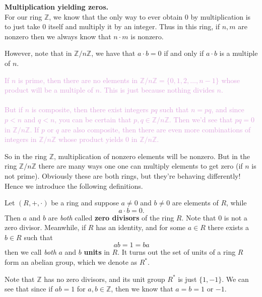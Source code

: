 \documentclass[12pt,letterpaper]{algebra_book}
\newcommand{\ZZ}{\mathbb{Z}}
\theoremstyle{definition}
\begin{document}
    \noindent\textbf{Multiplication yielding zeros.}\\
    For our ring $\mathbb{Z}$, we know that the only way to ever
    obtain $0$ by multiplication is to just take $0$ itself and multiply
    it by an integer. Thus in this ring, if $n, m$ are nonzero
    then we always know that $n \cdot m$ is nonzero.
    
    However, note that in $\ZZ/n\ZZ$, we have
    that $a \cdot b = 0$ if and only if $a \cdot b$ is a multiple
    of $n$.

    \textcolor{Plum}{If $n$ is prime, then there are no elements
    in $\ZZ/n\ZZ = \{0, 1, 2, \dots, n-1\}$ whose product will be
    a multiple of $n$. This is just because nothing divides $n$.
    \\
    \\
    But if $n$ is composite, then there exist
    integers $pq$ such that $n = pq$, and since $p < n$ and $q <
    n$, you can be certain that $p, q \in \ZZ/n\ZZ$. Then we'd see
    that $pq = 0$ in $\ZZ/n\ZZ$. If $p$ or $q$ are also composite, then
    there are even more combinations of integers in $\ZZ/n\ZZ$
    whose product yields 0 in $\ZZ/n\ZZ$. 
    }

    So in the ring $\ZZ$, multiplication of nonzero elements will
    be nonzero. But in the ring $\ZZ/n\ZZ$ there are many ways one
    one can multiply elements to get zero (if $n$ is not prime).
    Obviously these are both rings, but they're behaving
    differently! Hence we introduce the following definitions. 

    \begin{definition}
        Let $(R, +, \cdot)$ be a ring and suppose $a \ne 0$ and $b
        \ne 0$ are elements of $R$,
        while 
        \[
            a \cdot b = 0.
        \]
        Then $a$ and $b$ are \textit{both} called
        \textbf{zero divisors} of the ring ${R}$. Note that $0$ is
        not a zero divisor.
        Meanwhile, if $R$ has an identity, and for some $a \in R$
        there exists a $b \in R$ such that 
        \[
            ab = 1 = ba
        \]
        then we call \textit{both} $a$ and $b$ \textbf{units} in $R$.
        It turns out the set of units of a ring $R$ form an
        abelian group, which we denote as $R^*$.
    \end{definition}

    Note that $\ZZ$ has no zero divisors, and its unit group $R^*$
    is just $\{1, -1\}$. We can see that since if $ab = 1$ for $a, b \in \ZZ$, then we
    know that $a = b = 1$ or $-1$.
\end{document}
